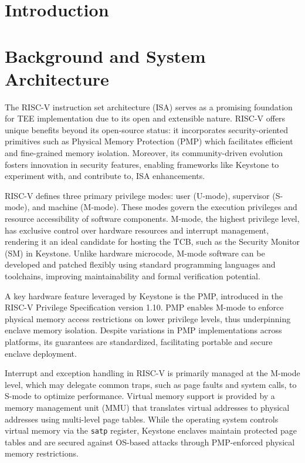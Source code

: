 \documentclass[english, version-2020-11]{uzl-thesis}
\begin{document}
\chapter{Introduction}


\chapter{Background and System Architecture}
The RISC-V instruction set architecture (ISA) serves as a promising foundation for TEE implementation due to its open and extensible nature. RISC-V offers unique benefits beyond its open-source status: it incorporates security-oriented primitives such as Physical Memory Protection (PMP) which facilitates efficient and fine-grained memory isolation. Moreover, its community-driven evolution fosters innovation in security features, enabling frameworks like Keystone to experiment with, and contribute to, ISA enhancements.

RISC-V defines three primary privilege modes: user (U-mode), supervisor (S-mode), and machine (M-mode). These modes govern the execution privileges and resource accessibility of software components. M-mode, the highest privilege level, has exclusive control over hardware resources and interrupt management, rendering it an ideal candidate for hosting the TCB, such as the Security Monitor (SM) in Keystone. Unlike hardware microcode, M-mode software can be developed and patched flexibly using standard programming languages and toolchains, improving maintainability and formal verification potential.

A key hardware feature leveraged by Keystone is the PMP, introduced in the RISC-V Privilege Specification version 1.10. PMP enables M-mode to enforce physical memory access restrictions on lower privilege levels, thus underpinning enclave memory isolation. Despite variations in PMP implementations across platforms, its guarantees are standardized, facilitating portable and secure enclave deployment.

Interrupt and exception handling in RISC-V is primarily managed at the M-mode level, which may delegate common traps, such as page faults and system calls, to S-mode to optimize performance. Virtual memory support is provided by a memory management unit (MMU) that translates virtual addresses to physical addresses using multi-level page tables. While the operating system controls virtual memory via the \texttt{satp} register, Keystone enclaves maintain protected page tables and are secured against OS-based attacks through PMP-enforced physical memory restrictions.
\end{document}
